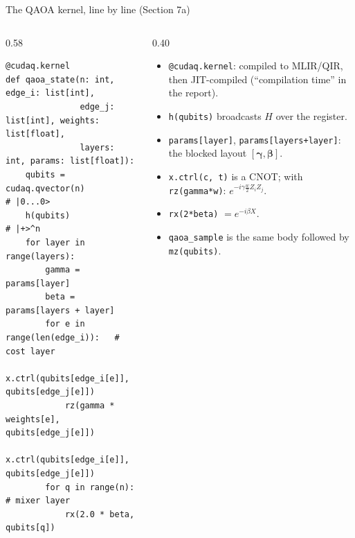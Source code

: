 \documentclass[aspectratio=169,11pt]{beamer}
\newcommand{\bg}{\boldsymbol\gamma}
\newcommand{\bb}{\boldsymbol\beta}
\begin{document}
\begin{frame}[fragile]{The QAOA kernel, line by line (Section 7a)}
  \begin{columns}[T]
    \begin{column}{0.58\textwidth}
\begin{lstlisting}
@cudaq.kernel
def qaoa_state(n: int, edge_i: list[int],
               edge_j: list[int], weights: list[float],
               layers: int, params: list[float]):
    qubits = cudaq.qvector(n)          # |0...0>
    h(qubits)                          # |+>^n
    for layer in range(layers):
        gamma = params[layer]
        beta = params[layers + layer]
        for e in range(len(edge_i)):   # cost layer
            x.ctrl(qubits[edge_i[e]], qubits[edge_j[e]])
            rz(gamma * weights[e], qubits[edge_j[e]])
            x.ctrl(qubits[edge_i[e]], qubits[edge_j[e]])
        for q in range(n):             # mixer layer
            rx(2.0 * beta, qubits[q])
\end{lstlisting}
    \end{column}
    \begin{column}{0.40\textwidth}
      \small
      \begin{itemize}
        \item \texttt{@cudaq.kernel}: compiled to MLIR/QIR, then JIT-compiled (``compilation time'' in the report).
        \item \texttt{h(qubits)} broadcasts $H$ over the register.
        \item \texttt{params[layer]}, \texttt{params[layers+layer]}: the blocked layout $[\bg, \bb]$.
        \item \texttt{x.ctrl(c, t)} is a CNOT; with \texttt{rz(gamma*w)}: $e^{-i\gamma\frac w2Z_iZ_j}$.
        \item \texttt{rx(2*beta)} $= e^{-i\beta X}$.
        \item \texttt{qaoa\_sample} is the same body followed by \texttt{mz(qubits)}.
      \end{itemize}
    \end{column}
  \end{columns}
\end{frame}
\end{document}
